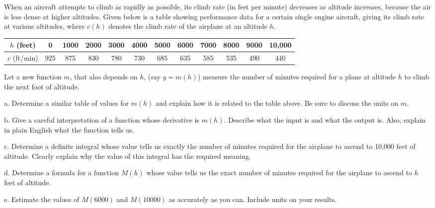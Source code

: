 \begin{exercises}
	\item When an aircraft attempts to climb as rapidly as
possible, its climb rate (in feet per minute) decreases as altitude
increases, because the air is less dense at higher altitudes.
Given below is a table showing performance data for a certain
single engine aircraft, giving its climb rate at various altitudes, where  $c(h)$ denotes the climb rate of the airplane at an altitude $h$.

\begin{center}
  \begin{tabular}{|c||c|c|c|c|c|c|c|c|c|c|c|}
    \hline
    $h$ (feet)&0&1000&2000&3000&4000&5000&6000&7000&8000&9000&10,000\\
    \hline
    $c$ (ft/min)&925&875&830&780&730&685&635&585&535&490&440\\
    \hline
  \end{tabular}
\end{center}

 Let a new function $m$, that also depends on $h$, (say $y = m(h)$) measure
the number of minutes required for a plane at altitude $h$ to climb the
next foot of altitude.
\be
	\item[a.] Determine a similar table of values for $m(h)$ and explain how it is related to the table above.  Be sure to discuss the units on $m$.

	\item[b.] Give a careful interpretation of a function whose derivative
is $m(h)$.  Describe what the input is and what the output is.  Also,
explain in plain English what the function tells us.

	\item[c.] Determine a definite integral whose value tells us exactly the number of minutes required for the airplane to ascend to
10,000 feet of altitude.  Clearly explain why the value of this integral has the required meaning.  

	\item[d.] Determine a formula for a function $M(h)$ whose value tells us the exact number of minutes required for the airplane to ascend to $h$ feet of altitude.

	\item[e.] Estimate the values of $M(6000)$ and $M(10000)$ as accurately as you can.  Include units on your results.
\ee

\end{exercises}
\afterexercises
